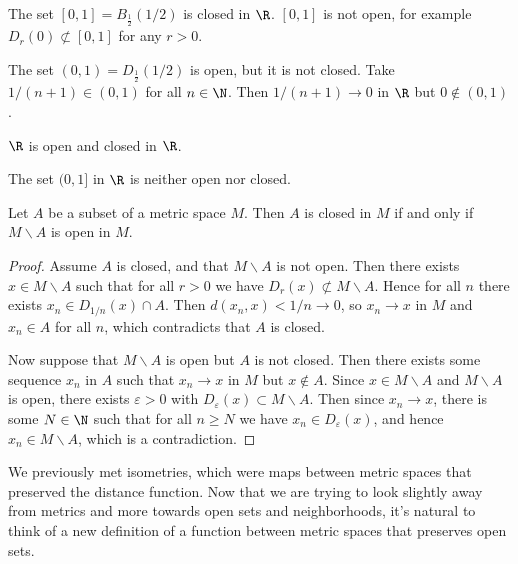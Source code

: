 \begin{example}
    The set $[0, 1] = B_{\frac{1}{2}}(1/2)$ is closed in $\R$. $[0, 1]$ is not open, for example $D_r(0) \not \subset [0, 1]$ for any $r > 0$.

    The set $(0, 1) = D_{\frac{1}{2}}(1/2)$ is open, but it is not closed. Take $1/(n + 1) \in (0, 1)$ for all $n \in \N$. Then $1/(n + 1) \rightarrow 0$ in $\R$ but $0 \not \in (0, 1)$.
\end{example}

\begin{example}
   $\R$ is open and closed in $\R$.
\end{example}

\begin{example}
    The set $(0, 1]$ in $\R$ is neither open nor closed.
\end{example}

\begin{lemma}
    Let $A$ be a subset of a metric space $M$. Then $A$ is closed in $M$ if and only if $M \backslash A$ is open in $M$.
\end{lemma}
\begin{proof}
    Assume $A$ is closed, and that $M \backslash A$ is not open. Then there exists $x \in M \backslash A$ such that for all $r > 0$ we have $D_r(x) \not \subset M\backslash A$. 
    Hence for all $n$ there exists $x_n \in D_{1/n}(x) \cap A$. Then $d(x_n, x) < 1/n \rightarrow 0$, so $x_n \rightarrow x$ in $M$ and $x_n \in A$ for all $n$, which contradicts that $A$ is closed.

    Now suppose that $M \backslash A$ is open but $A$ is not closed. Then there exists some sequence $x_n$ in $A$ such that $x_n \rightarrow x$ in $M$ but $x \not \in A$. Since $x \in M \backslash A$ and $M \backslash A$ is open, there exists $\varepsilon > 0$ with $D_\varepsilon(x) \subset M \backslash A$. Then since $x_n \rightarrow x$, there is some $N \in \N$ such that for all $n \geq N$ we have $x_n \in D_{\varepsilon}(x)$, and hence $x_n \in M \backslash A$, which is a contradiction.
\end{proof}

We previously met isometries, which were maps between metric spaces that preserved the distance function. Now that we are trying to look slightly away from metrics and more towards open sets and neighborhoods, it's natural to think of a new definition of a function between metric spaces that preserves open sets.

